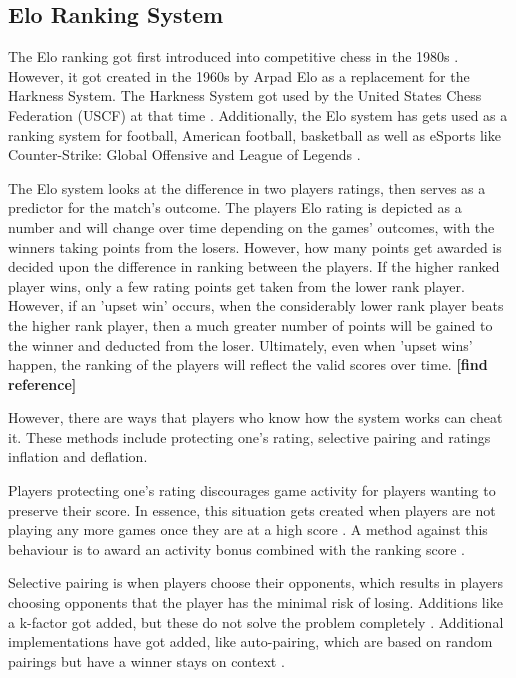 	\subsection{Elo Ranking System}
		The Elo ranking got first introduced into competitive chess in the 1980s \cite{weng2011bayesian}. However, it got created in the 1960s by Arpad Elo as a replacement for the Harkness System. The Harkness System got used by the United States Chess Federation (USCF) at that time \cite{elo1978rating}. Additionally, the Elo system has gets used as a ranking system for football, American football, basketball as well as eSports like Counter-Strike: Global Offensive and League of Legends \cite{silver2015we, pradhan2020power}.
		
		The Elo system looks at the difference in two players ratings, then serves as a predictor for the match's outcome. The players Elo rating is depicted as a number and will change over time depending on the games' outcomes, with the winners taking points from the losers. However, how many points get awarded is decided upon the difference in ranking between the players. If the higher ranked player wins, only a few rating points get taken from the lower rank player. However, if an 'upset win' occurs, when the considerably lower rank player beats the higher rank player, then a much greater number of points will be gained to the winner and deducted from the loser. Ultimately, even when 'upset wins' happen, the ranking of the players will reflect the valid scores over time. \textbf{[find reference]}
		
		However, there are ways that players who know how the system works can cheat it. These methods include protecting one's rating, selective pairing and ratings inflation and deflation.
		
		Players protecting one's rating discourages game activity for players wanting to preserve their score. In essence, this situation gets created when players are not playing any more games once they are at a high score \cite{friedman2013playing}.  A method against this behaviour is to award an activity bonus combined with the ranking score \cite{edelkamp2021elo}.
		
		Selective pairing is when players choose their opponents, which results in players choosing opponents that the player has the minimal risk of losing. Additions like a k-factor got added, but these do not solve the problem completely \cite{edelkamp2021elo}. Additional implementations have got added, like auto-pairing, which are based on random pairings but have a winner stays on context \cite{edelkamp2021elo}.
		
